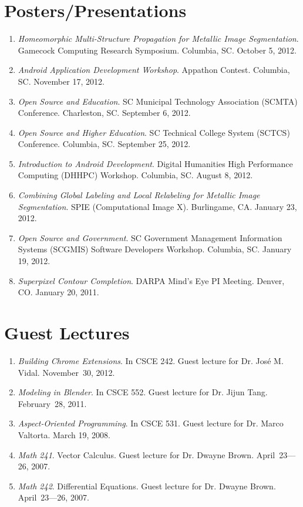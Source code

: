 \documentclass[10pt]{article}
\begin{document}
\section{Posters/Presentations}
\begin{enumerate}
\renewcommand{\labelenumi}{[P\arabic{enumi}] }
\item \emph{Homeomorphic Multi-Structure Propagation for Metallic
  Image Segmentation}.  Gamecock Computing Research Symposium.
  Columbia, SC.  October 5, 2012.
\item \emph{Android Application Development Workshop}.  Appathon
  Contest.  Columbia, SC.  November 17, 2012.
\item \emph{Open Source and Education}. SC Municipal Technology
  Association (SCMTA) Conference. Charleston, SC.  September 6, 2012.
\item \emph{Open Source and Higher Education}.  SC Technical College
  System (SCTCS) Conference.  Columbia, SC.  September 25, 2012.
\item \emph{Introduction to Android Development}.  Digital Humanities
  High Performance Computing (DHHPC) Workshop.  Columbia, SC.  August
  8, 2012.
\item \emph{Combining Global Labeling and Local Relabeling for
  Metallic Image Segmentation}.  SPIE (Computational Image X).
  Burlingame, CA.  January 23, 2012.
\item \emph{Open Source and Government}.  SC Government Management
  Information Systems (SCGMIS) Software Developers Workshop.
  Columbia, SC.  January 19, 2012.
\item \emph{Superpixel Contour Completion}.  DARPA Mind's Eye PI
  Meeting.  Denver, CO.  January 20, 2011.
\end{enumerate}

\section{Guest Lectures}
\begin{enumerate}
\renewcommand{\labelenumi}{[G\arabic{enumi}] }
\item \emph{Building Chrome Extensions}.  In CSCE 242.  Guest lecture for Dr. José M. Vidal.  November~30, 2012.
\item \emph{Modeling in Blender}.  In CSCE 552.  Guest lecture for Dr. Jijun Tang.  February~28, 2011.
\item \emph{Aspect-Oriented Programming}. In CSCE 531. Guest lecture for Dr. Marco Valtorta. March 19, 2008.
\item \emph{Math 241}. Vector Calculus. Guest lecture for Dr. Dwayne Brown. April~23---26, 2007. 
\item \emph{Math 242}. Differential Equations. Guest lecture for Dr. Dwayne Brown. April~23---26, 2007. 
\end{enumerate}
\end{document}
